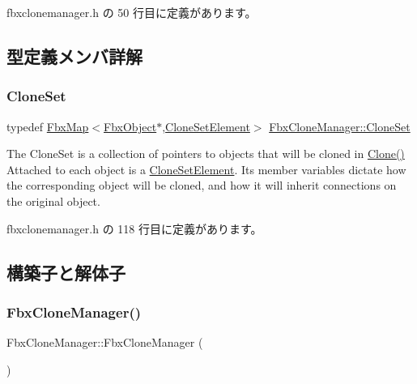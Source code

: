  fbxclonemanager.\+h の 50 行目に定義があります。



\subsection{型定義メンバ詳解}
\mbox{\label{class_fbx_clone_manager_aeb8a9c04c9c36eb7e551186a0b18f10d}} 
\subsubsection{\texorpdfstring{Clone\+Set}{CloneSet}}
{\footnotesize\ttfamily typedef \hyperlink{class_fbx_map}{Fbx\+Map}$<$\hyperlink{class_fbx_object}{Fbx\+Object}$\ast$,\hyperlink{struct_fbx_clone_manager_1_1_clone_set_element}{Clone\+Set\+Element}$>$ \hyperlink{class_fbx_clone_manager_aeb8a9c04c9c36eb7e551186a0b18f10d}{Fbx\+Clone\+Manager\+::\+Clone\+Set}}

The Clone\+Set is a collection of pointers to objects that will be cloned in \hyperlink{class_fbx_clone_manager_a2fd72cbf71c6dd3105310445c1a7c2b1}{Clone()} Attached to each object is a \hyperlink{struct_fbx_clone_manager_1_1_clone_set_element}{Clone\+Set\+Element}. Its member variables dictate how the corresponding object will be cloned, and how it will inherit connections on the original object. 

 fbxclonemanager.\+h の 118 行目に定義があります。



\subsection{構築子と解体子}
\mbox{\label{class_fbx_clone_manager_a107bf53621e736a37d7a6ead38a4d899}} 
\subsubsection{\texorpdfstring{Fbx\+Clone\+Manager()}{FbxCloneManager()}}
{\footnotesize\ttfamily Fbx\+Clone\+Manager\+::\+Fbx\+Clone\+Manager (\begin{DoxyParamCaption}{ }\end{DoxyParamCaption})}

